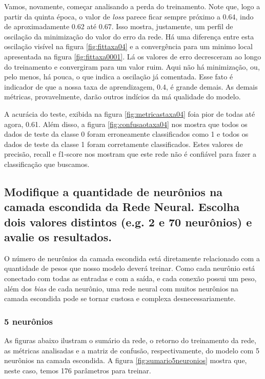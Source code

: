 \documentclass[12pt]{article}
\begin{document}
Vamos, novamente, começar analisando a perda do treinamento. Note que, logo a partir da quinta época, o valor de \textit{loss} parece ficar sempre próximo a 0.64, indo de aproximadamente 0.62 até 0.67. Isso mostra, justamente, um perfil de oscilação da minimização do valor do erro da rede. Há uma diferença entre esta oscilação visível na figura \ref{fig:fittaxa04} e a convergência para um minimo local apresentada na figura \ref{fig:fittaxa0001}. Lá os valores de erro decresceram ao longo do treinamento e convergiram para um valor ruim. Aqui não há minimização, ou, pelo menos, há pouca, o que indica a oscilação já comentada. Esse fato é indicador de que a nossa taxa de aprendizagem, 0.4, é grande demais. As demais métricas, provavelmente, darão outros indícios da má qualidade do modelo.

A acurácia do teste, exibida na figura \ref{fig:metricastaxa04} foia pior de todas até agora, 0.61. Além disso, a figura \ref{fig:confusaotaxa04} nos mostra que todos os dados de teste da classe 0 foram erroneamente classificados como 1 e todos os dados de teste da classe 1 foram corretamente classificados. Estes valores de precisão, recall e f1-score nos mostram que este rede não é confiável para fazer a classificação que buscamos. 

\subsection{Modifique a quantidade de neurônios na camada escondida da Rede Neural. Escolha dois valores distintos (e.g. 2 e 70 neurônios) e avalie os	resultados.}

O número de neurônios da camada escondida está diretamente relacionado com a quantidade de pesos que nosso modelo deverá treinar. Como cada neurônio está conectado com todas as entradas e com a saída, e cada conexão possui um peso, além dos \textit{bias} de cada neurônio, uma rede neural com muitos neurônios na camada escondida pode se tornar custosa e complexa desnecessariamente.

\subsubsection{5 neurônios}

As figuras abaixo ilustram o sumário da rede, o retorno do treinamento da rede, as métricas analisadas e a matriz de confusão, respectivamente, do modelo com 5 neurônios na camada escondida. A figura \ref{fig:sumario5neuronios} mostra que, neste caso, temos 176 parâmetros para treinar.
\end{document}

